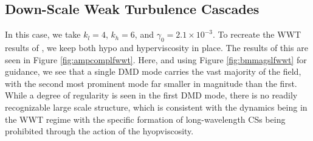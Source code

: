 \documentclass[a4paper,11pt]{article}
\begin{document}
\subsection*{Down-Scale Weak Turbulence Cascades}
In this case, we take $k_{l}=4$, $k_{h}=6$, and $\gamma_{0}=2.1\times 10^{-3}$.  To recreate the WWT results of \cite{nazarenko2}, we keep both hypo and hyperviscosity in place.  The results of this are seen in Figure \ref{fig:ampcomplfwwt}.    Here, and using Figure \ref{fig:bmmagslfwwt} for guidance, we see that a single DMD mode carries the vast majority of the field, with the second most prominent mode far smaller in magnitude than the first.  While a degree of regularity is seen in the first DMD mode, there is no readily recognizable large scale structure, which is consistent with the dynamics being in the WWT regime with the specific formation of long-wavelength CSs being prohibited through the action of the hyopviscosity.
\end{document}
